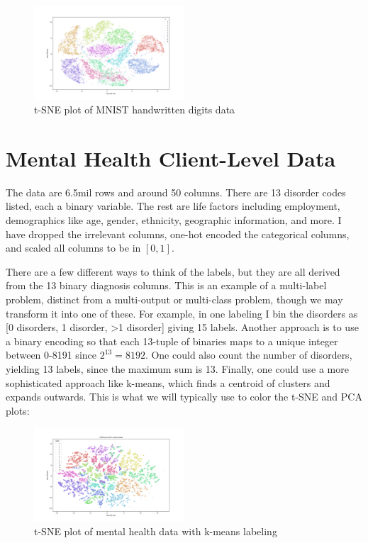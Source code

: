 \documentclass[11pt]{amsart}
\begin{document}
\begin{figure}[h]
\caption{t-SNE plot of MNIST handwritten digits data}
\centering
\includegraphics[width=0.5\textwidth]{t-SNE_plot_MNIST}
\end{figure}

\section{Mental Health Client-Level Data}

The data are 6.5mil rows and around 50 columns. There are 13 disorder codes listed, each a binary variable. The rest are life factors including employment, demographics like age, gender, ethnicity, geographic information, and more. I have dropped the irrelevant columns, one-hot encoded the categorical columns, and scaled all columns to be in $[0,1]$.

There are a few different ways to think of the labels, but they are all derived from the 13 binary diagnosis columns. This is an example of a multi-label problem, distinct from a multi-output or multi-class problem, though we may transform it into one of these. For example, in one labeling I bin the disorders as [0 disorders, 1 disorder, >1 disorder] giving 15 labels. Another approach is to use a binary encoding so that each 13-tuple of binaries maps to a unique integer between 0-8191 since $2^{13} = 8192$. One could also count the number of disorders, yielding 13 labels, since the maximum sum is 13. Finally, one could use a more sophisticated approach like k-means, which finds a centroid of clusters and expands outwards. This is what we will typically use to color the t-SNE and PCA plots:

\begin{figure}[h]
\caption{t-SNE plot of mental health data with k-means labeling}
\centering
\includegraphics[width=0.5\textwidth]{t-sne_k-means_label.png}
\end{figure}
\end{document}
